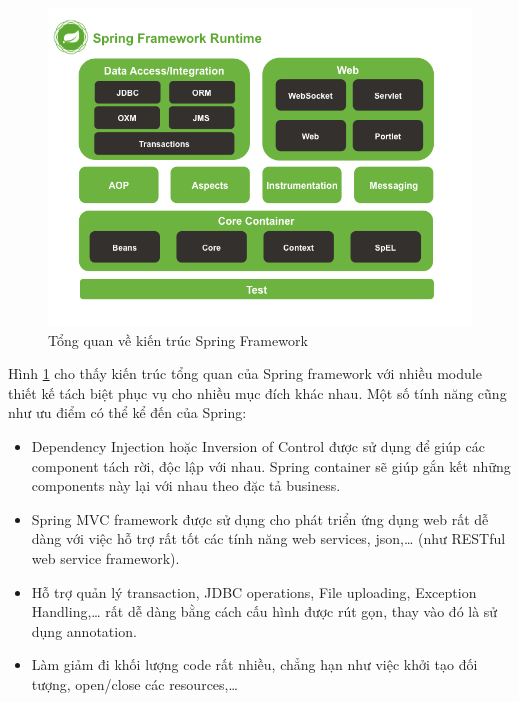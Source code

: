 \documentclass[12pt,a4paper,oneside]{extbook}
\begin{document}
\begin{figure}[h]
  \centering
     \includegraphics[width=12cm]{3-spring-framework-overview}
  \caption{Tổng quan về kiến trúc Spring Framework}\label{fig:3-spring-framework-overview}
\end{figure}

\noindent
Hình \ref{fig:3-spring-framework-overview} cho thấy kiến trúc tổng quan của Spring framework với nhiều module thiết kế tách biệt phục vụ cho nhiều mục đích khác nhau. Một số tính năng cũng như ưu điểm có thể kể đến của Spring:

\begin{itemize}[topsep=1mm,itemsep=-0.5mm]
\item Dependency Injection hoặc Inversion of Control được sử dụng để giúp các component tách rời, độc lập với nhau. Spring container sẽ giúp gắn kết những components này lại với nhau theo đặc tả business.
\item Spring MVC framework được sử dụng cho phát triển ứng dụng web rất dễ dàng với việc hỗ trợ rất tốt các tính năng web services, json,\dots\hspace{0mm}  (như RESTful web service framework).
\item Hỗ trợ quản lý transaction, JDBC operations, File uploading, Exception Handling,\dots\hspace{0mm} rất dễ dàng bằng cách cấu hình được rút gọn, thay vào đó là sử dụng annotation.
\item Làm giảm đi khối lượng code rất nhiều, chẳng hạn như việc khởi tạo đối tượng, open/close các resources,\dots
\vspace{1mm}
\end{itemize}
\end{document}
